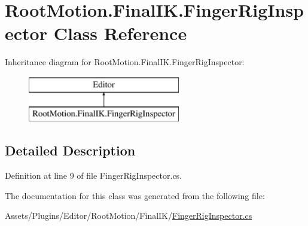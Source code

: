 \hypertarget{class_root_motion_1_1_final_i_k_1_1_finger_rig_inspector}{}\section{Root\+Motion.\+Final\+I\+K.\+Finger\+Rig\+Inspector Class Reference}
\label{class_root_motion_1_1_final_i_k_1_1_finger_rig_inspector}
Inheritance diagram for Root\+Motion.\+Final\+I\+K.\+Finger\+Rig\+Inspector\+:\begin{figure}[H]
\begin{center}
\leavevmode
\includegraphics[height=2.000000cm]{class_root_motion_1_1_final_i_k_1_1_finger_rig_inspector}
\end{center}
\end{figure}


\subsection{Detailed Description}


Definition at line 9 of file Finger\+Rig\+Inspector.\+cs.



The documentation for this class was generated from the following file\+:\begin{DoxyCompactItemize}
\item 
Assets/\+Plugins/\+Editor/\+Root\+Motion/\+Final\+I\+K/\mbox{\hyperlink{_finger_rig_inspector_8cs}{Finger\+Rig\+Inspector.\+cs}}\end{DoxyCompactItemize}
